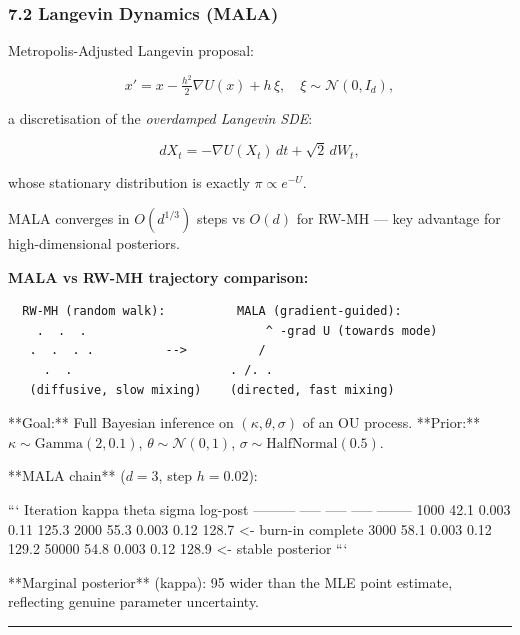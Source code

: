\documentclass[11pt,a4paper]{article}
\begin{document}
\subsubsection{7.2 Langevin Dynamics (MALA)}\label{langevin-dynamics-mala}

Metropolis-Adjusted Langevin proposal:

\[x' = x - \tfrac{h^2}{2}\nabla U(x) + h\,\xi, \quad \xi\sim\mathcal{N}(0,I_d),\]

a discretisation of the \emph{overdamped Langevin SDE}:

\[dX_t = -\nabla U(X_t)\,dt + \sqrt{2}\,dW_t,\]

whose stationary distribution is exactly \(\pi \propto e^{-U}\).

MALA converges in \(O(d^{1/3})\) steps vs \(O(d)\) for RW-MH --- key advantage for high-dimensional posteriors.

\textbf{MALA vs RW-MH trajectory comparison:}

\begin{verbatim}
  RW-MH (random walk):          MALA (gradient-guided):
    .  .  .                         ^ -grad U (towards mode)
   .  .  . .          -->          /
     .  .                      . /. .
   (diffusive, slow mixing)    (directed, fast mixing)
\end{verbatim}

\begin{tcolorbox}[colback=notebg!60,colframe=optgreen,fonttitle=\bfseries\sffamily,title={\textsf{\textbf{Example}} — Example — Calibrating OU Parameters via MCMC},breakable]
**Goal:** Full Bayesian inference on $(\kappa, \theta, \sigma)$ of an OU process.
**Prior:** $\kappa \sim \text{Gamma}(2,0.1)$, $\theta \sim \mathcal{N}(0,1)$,
$\sigma \sim \text{HalfNormal}(0.5)$.

**MALA chain** ($d=3$, step $h=0.02$):

```
Iteration  kappa   theta   sigma   log-post
---------  -----   -----   -----   --------
  1000      42.1   0.003   0.11     125.3
  2000      55.3   0.003   0.12     128.7   <- burn-in complete
  3000      58.1   0.003   0.12     129.2
 50000      54.8   0.003   0.12     128.9   <- stable posterior
```

**Marginal posterior** (kappa): 95%
wider than the MLE point estimate, reflecting genuine parameter uncertainty.
\end{tcolorbox}

\begin{center}\rule{0.5\linewidth}{0.5pt}\end{center}
\end{document}
